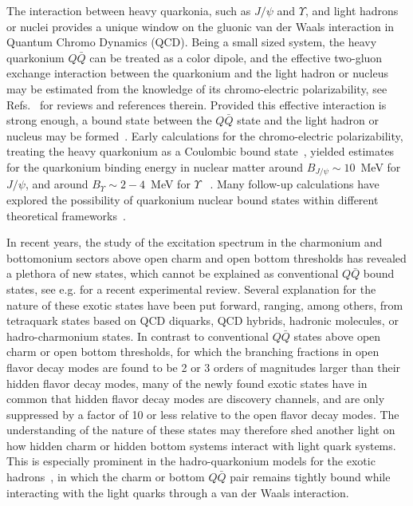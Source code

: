 \documentclass[prd,amsmath,%
twocolumn,floatfix,amssymb, preprintnumbers, nofootinbib, superscriptaddress]{revtex4}
\begin{document}
The interaction between heavy quarkonia, such as $J/\psi$ and $\Upsilon$, and light hadrons or nuclei provides a unique window on the gluonic van der Waals interaction in Quantum Chromo Dynamics (QCD). Being a small sized system, the heavy quarkonium $Q \bar Q$ can be treated as a color dipole, and the effective two-gluon exchange interaction between the quarkonium and the light hadron  or nucleus may be estimated from the knowledge of its chromo-electric polarizability, see 
Refs.~\cite{Kharzeev:1995ij,Voloshin:2007dx,Hosaka:2016ypm} for reviews and references therein. 
Provided this effective interaction is strong enough, 
a bound state between the
$Q \bar Q$ state and the light hadron or  nucleus may be formed~\cite{Brodsky:1989jd, Wasson:1991fb, Luke:1992tm}. 
Early calculations for the chromo-electric polarizability,  treating the heavy quarkonium as a Coulombic bound state~\cite{Peskin:1979va,Bhanot:1979vb}, 
yielded estimates for the quarkonium binding energy in 
nuclear matter around $B_{J/\psi} \sim 10$~MeV for $J/\psi$,  and around $B_{\Upsilon} \sim 2 - 4$~MeV for $\Upsilon$ ~\cite{Luke:1992tm}. Many follow-up calculations have explored the possibility of quarkonium nuclear bound states within different theoretical  frameworks~\cite{Brodsky:1997gh, Ko:2000jx, Tsushima:2011kh, Yokota:2013sfa, Beane:2014sda}. 

In recent years, the study of the excitation spectrum in the charmonium and bottomonium sectors above open charm and  open bottom thresholds has revealed a plethora of new  states, which cannot be explained as conventional $Q \bar Q$ bound states, see e.g. \cite{Olsen:2017bmm} for a recent experimental review. Several explanation for the nature of these exotic states have been put forward, ranging, among others, from tetraquark states based on QCD diquarks, QCD hybrids, hadronic molecules, or hadro-charmonium states. In contrast to conventional $Q \bar Q$ states above open charm or open bottom thresholds, for which the branching fractions in open flavor decay modes are found to be 2 or 3 orders of magnitudes larger than their hidden flavor decay modes, many of the newly found exotic states have in common that hidden flavor decay modes are discovery channels, and are only suppressed by a factor of 10 or less relative to the open flavor 
decay modes. The understanding of the nature of these states may therefore shed another light on how hidden charm or hidden bottom systems interact with light quark systems. This is especially prominent in the hadro-quarkonium models for the exotic hadrons~\cite{Dubynskiy:2008mq}, in which 
the charm or bottom $Q \bar Q$ pair remains tightly bound while interacting with the light quarks through a van der Waals interaction.
\end{document}
